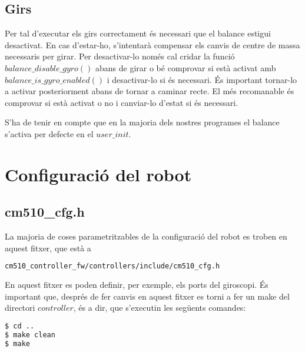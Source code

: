 \documentclass{article}
\begin{document}
\subsection{Girs}
Per tal d'executar els girs correctament és necessari que el balance estigui desactivat. En cas d'estar-ho, s'intentarà compensar els canvis de centre de massa necessaris per girar. Per desactivar-lo només cal cridar la funció $balance\_disable\_gyro()$ abans de girar o bé comprovar si està activat amb $balance\_is\_gyro\_enabled()$ i desactivar-lo si és necessari. És important tornar-lo a activar posteriorment abans de tornar a caminar recte. El més recomanable és comprovar si està activat o no i canviar-lo d'estat si és necessari.

S'ha de tenir en compte que en la majoria dels nostres programes el balance s'activa per defecte en el $user\_init$.

\section{Configuració del robot}
\subsection{cm510\_cfg.h}
La majoria de coses parametritzables de la configuració del robot es troben en aquest fitxer, que està a 
\begin{lstlisting}[language=bash]
cm510_controller_fw/controllers/include/cm510_cfg.h
\end{lstlisting}
En aquest fitxer es poden definir, per exemple, els ports del giroscopi.
És important que, després de fer canvis en aquest fitxer es torni a fer un make del directori $controller$, és a dir, que s'executin les següents comandes:
\begin{lstlisting}[language=bash]
$ cd ..
$ make clean
$ make
\end{lstlisting}
\end{document}
